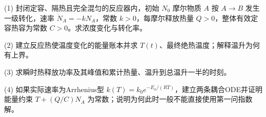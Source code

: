 (1) 封闭定容、隔热且完全混匀的反应器内，初始 \(N_0\) 摩尔物质 \(A\) 按 \(A\to B\) 发生一级转化，速率 \(\dot N_A=-kN_A\)，常数 \(k>0\)，每摩尔释放热量 \(Q>0\)，整体有效定容热容为常数 \(C>0\)。求浓度变化与转化率。

(2) 建立反应热使温度变化的能量账本并求 \(T(t)\)、最终绝热温度；解释温升为何有上界。

(3) 求瞬时热释放功率及其峰值和累计热量、温升到总温升一半的时刻。

(4) 如果实际速率为Arrhenius型 \(k(T)=k_0e^{-E_a/(RT)}\)，建立两条耦合ODE并证明能量约束 \(T+(Q/C)N_A\) 为常数；说明为何此时一般不能直接使用第一问指数解。
